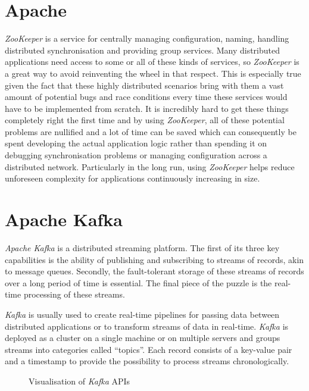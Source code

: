 \section{Apache }
\label{sec:background-zookeeper}

\textit{ZooKeeper} is a service for centrally managing configuration, naming, handling distributed
synchronisation and providing group services. Many distributed applications need access to some or
all of these kinds of services, so \textit{ZooKeeper} is a great way to avoid reinventing the wheel
in that respect. This is especially true given the fact that these highly distributed scenarios
bring with them a vast amount of potential bugs and race conditions every time these services would
have to be implemented from scratch. It is incredibly hard to get these things completely right the
first time and by using \textit{ZooKeeper}, all of these potential problems are nullified and a lot
of time can be saved which can consequently be spent developing the actual application logic rather
than spending it on debugging synchronisation problems or managing configuration across a
distributed network. Particularly in the long run, using \textit{ZooKeeper} helps reduce unforeseen
complexity for applications continuously increasing in size.
\cite{zookeeper-homepage}

\section{Apache Kafka}
\label{sec:background-kafka}

\textit{Apache Kafka} is a distributed streaming platform. The first of its three key capabilities
is the ability of publishing and subscribing to streams of records, akin to message queues.
Secondly, the fault-tolerant storage of these streams of records over a long period of time is
essential. The final piece of the puzzle is the real-time processing of these streams.

\textit{Kafka} is usually used to create real-time pipelines for passing data between distributed
applications or to transform streams of data in real-time. \textit{Kafka} is deployed as a cluster
on a single machine or on multiple servers and groups streams into categories called “topics”. Each
record consists of a key-value pair and a timestamp to provide the possibility to process streams
chronologically.

\begin{figure}[H]
  \centering
  \caption{Visualisation of \textit{Kafka} APIs \cite{kafka-complete-introduction}}
  \label{fig:kafka-apis}
\end{figure}

